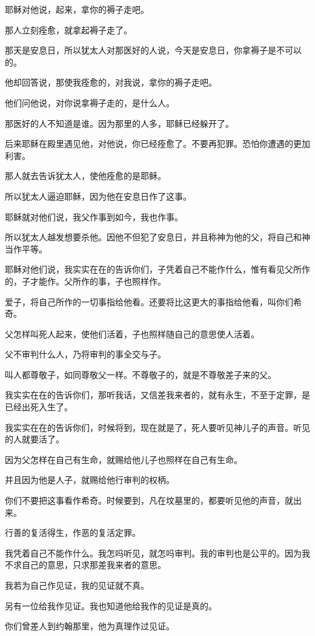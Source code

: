 \documentclass[12pt,oneside]{book}
\begin{document}
耶稣对他说，起来，拿你的褥子走吧。

那人立刻痊愈，就拿起褥子走了。

那天是安息日，所以犹太人对那医好的人说，今天是安息日，你拿褥子是不可以的。

他却回答说，那使我痊愈的，对我说，拿你的褥子走吧。

他们问他说，对你说拿褥子走的，是什么人。

那医好的人不知道是谁。因为那里的人多，耶稣已经躲开了。

后来耶稣在殿里遇见他，对他说，你已经痊愈了。不要再犯罪。恐怕你遭遇的更加利害。

那人就去告诉犹太人，使他痊愈的是耶稣。

所以犹太人逼迫耶稣，因为他在安息日作了这事。

耶稣就对他们说，我父作事到如今，我也作事。

所以犹太人越发想要杀他。因他不但犯了安息日，并且称神为他的父，将自己和神当作平等。

耶稣对他们说，我实实在在的告诉你们，子凭着自己不能作什么，惟有看见父所作的，子才能作。父所作的事，子也照样作。

爱子，将自己所作的一切事指给他看。还要将比这更大的事指给他看，叫你们希奇。

父怎样叫死人起来，使他们活着，子也照样随自己的意思使人活着。

父不审判什么人，乃将审判的事全交与子。

叫人都尊敬子，如同尊敬父一样。不尊敬子的，就是不尊敬差子来的父。

我实实在在的告诉你们，那听我话，又信差我来者的，就有永生，不至于定罪，是已经出死入生了。

我实实在在的告诉你们，时候将到，现在就是了，死人要听见神儿子的声音。听见的人就要活了。

因为父怎样在自己有生命，就赐给他儿子也照样在自己有生命。

并且因为他是人子，就赐给他行审判的权柄。

你们不要把这事看作希奇。时候要到，凡在坟墓里的，都要听见他的声音，就出来。

行善的复活得生，作恶的复活定罪。

我凭着自己不能作什么。我怎吗听见，就怎吗审判。我的审判也是公平的。因为我不求自己的意思，只求那差我来者的意思。

我若为自己作见证，我的见证就不真。

另有一位给我作见证。我也知道他给我作的见证是真的。

你们曾差人到约翰那里，他为真理作过见证。
\end{document}
